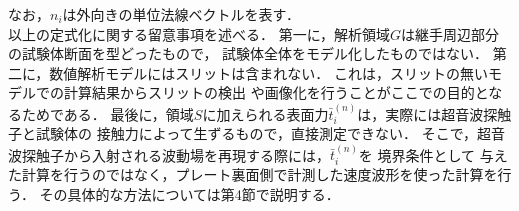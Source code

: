 なお，$n_i$は外向きの単位法線ベクトルを表す．
\\
\hspace{\parindent}
以上の定式化に関する留意事項を述べる．
第一に，解析領域$G$は継手周辺部分の試験体断面を型どったもので，
試験体全体をモデル化したものではない．
第二に，数値解析モデルにはスリットは含まれない．
これは，スリットの無いモデルでの計算結果からスリットの検出
や画像化を行うことがここでの目的となるためである．
最後に，領域$S$に加えられる表面力$\bar{t}_i^{(n)}$は，実際には超音波探触子と試験体の
接触力によって生ずるもので，直接測定できない．
そこで，超音波探触子から入射される波動場を再現する際には，$\bar{t}^{(n)}_i$を
%
境界条件として
%
与えた計算を行うのではなく，プレート裏面側で計測した速度波形を使った計算を行う．
その具体的な方法については第4節で説明する．
